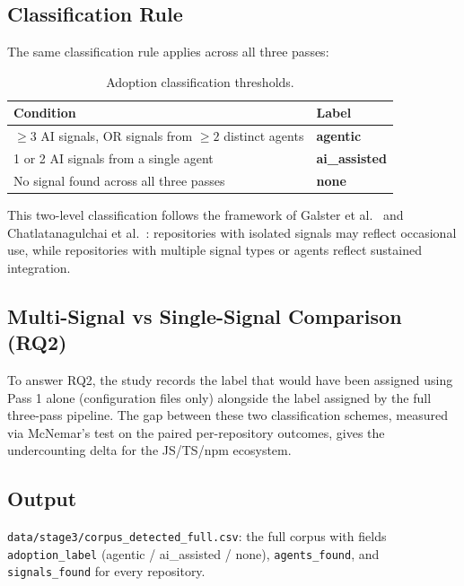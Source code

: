 \documentclass[12pt, a4paper]{article}
\begin{document}
\subsection{Classification Rule}

The same classification rule applies across all three passes:

\begin{table}[h]
\centering
\caption{Adoption classification thresholds.}
\begin{tabular}{@{}ll@{}}
\toprule
\textbf{Condition} & \textbf{Label} \\
\midrule
$\geq 3$ AI signals, OR signals from $\geq 2$ distinct agents & \textbf{agentic} \\
1 or 2 AI signals from a single agent                         & \textbf{ai\_assisted} \\
No signal found across all three passes                        & \textbf{none} \\
\bottomrule
\end{tabular}
\end{table}

This two-level classification follows the framework of Galster et
al.~\cite{galsterConfig2026} and Chatlatanagulchai et
al.~\cite{chatlatanagulchai2025}: repositories with isolated signals may
reflect occasional use, while repositories with multiple signal types or
agents reflect sustained integration.

\subsection{Multi-Signal vs Single-Signal Comparison (RQ2)}

To answer RQ2, the study records the label that would have been assigned
using Pass 1 alone (configuration files only) alongside the label assigned
by the full three-pass pipeline. The gap between these two classification
schemes, measured via McNemar's test on the paired per-repository outcomes,
gives the undercounting delta for the JS/TS/npm ecosystem.

\subsection{Output}

\texttt{data/stage3/corpus\_detected\_full.csv}: the full corpus with fields
\texttt{adoption\_label} (agentic / ai\_assisted / none),
\texttt{agents\_found}, and \texttt{signals\_found} for every repository.
\end{document}
